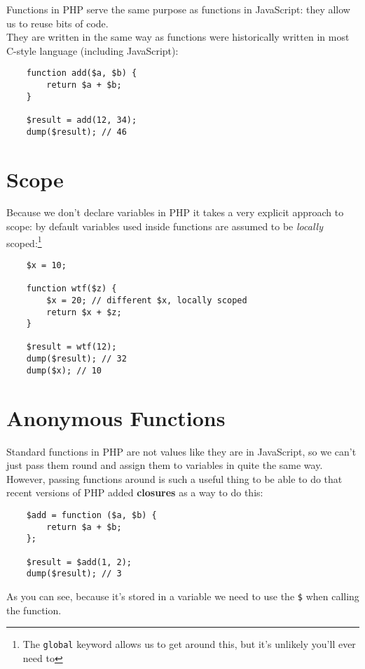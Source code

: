 Functions in PHP serve the same purpose as functions in JavaScript: they allow us to reuse bits of code.
\\

They are written in the same way as functions were historically written in most C-style language (including JavaScript):

\begin{verbatim}
    function add($a, $b) {
        return $a + $b;
    }

    $result = add(12, 34);
    dump($result); // 46
\end{verbatim}


\pagebreak


\section{Scope}

Because we don't declare variables in PHP it takes a very explicit approach to scope: by default variables used inside functions are assumed to be \textit{locally} scoped:\footnote{The \texttt{global} keyword allows us to get around this, but it's unlikely you'll ever need to}

\begin{verbatim}
    $x = 10;

    function wtf($z) {
        $x = 20; // different $x, locally scoped
        return $x + $z;
    }

    $result = wtf(12);
    dump($result); // 32
    dump($x); // 10
\end{verbatim}


\section{Anonymous Functions}

Standard functions in PHP are not values like they are in JavaScript, so we can't just pass them round and assign them to variables in quite the same way. However, passing functions around is such a useful thing to be able to do that recent versions of PHP added \textbf{closures} as a way to do this:

\begin{verbatim}
    $add = function ($a, $b) {
        return $a + $b;
    };

    $result = $add(1, 2);
    dump($result); // 3
\end{verbatim}

As you can see, because it's stored in a variable we need to use the \texttt{\$} when calling the function.


